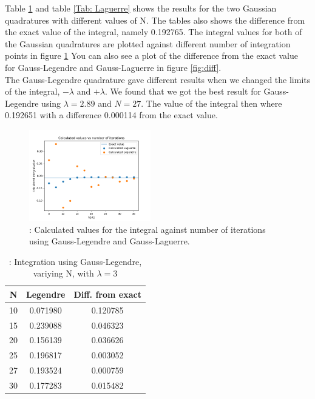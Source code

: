 \documentclass{article}
\begin{document}
Table \ref{Tab: Legendre} and table \ref{Tab: Laguerre} shows the results for the two Gaussian quadratures with different values of N. The tables also shows the difference from the exact value of the integral, namely 0.192765. The integral values for both of the Gaussian quadratures are plotted against different number of integration points in figure \ref{fig:int} You can also see a plot of the difference from the exact value for Gauss-Legendre and Gauss-Laguerre in figure \ref{fig:diff}.\\

The Gauss-Legendre quadrature gave different results when we changed the limits of the integral, $-\lambda$ and $+\lambda$. We found that we got the best result for Gauss-Legendre using $\lambda = 2.89$ and $N=27$. The value of the integral then where 0.192651 with a difference 0.000114 from the exact value.

\begin{figure}[hbt]
\begin{center}
    \includegraphics[width=200px]{Leg_lag_int.png}
    \caption{: Calculated values for the integral against number of iterations using Gauss-Legendre and Gauss-Laguerre.}
    \label{fig:int}
\end{center}
\end{figure}

\begin{table}[h!]
  \caption{: Integration using Gauss-Legendre, variying N, with $\lambda=3$ }
  \begin{tabular}{c c c}
    N & Legendre & Diff. from exact \\
    \hline
    10 & 0.071980 & 0.120785 \\
    15 & 0.239088 & 0.046323 \\
    20 & 0.156139 & 0.036626 \\
    25 & 0.196817 & 0.003052 \\
    27 & 0.193524 & 0.000759 \\
    30 & 0.177283 & 0.015482 \\
  \end{tabular}
  \label{Tab: Legendre}
\end{table}
\end{document}
